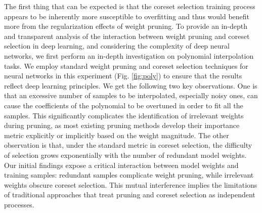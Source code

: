 The first thing that can be expected is that the coreset selection training process appears to be inherently more susceptible to overfitting and thus would benefit more from the regularization effects of weight pruning.
To provide an in-depth and transparent analysis of the interaction between weight pruning and coreset selection in deep learning, and considering the complexity of deep neural networks, we first perform an in-depth investigation on polynomial interpolation tasks. 
We employ standard weight pruning and coreset selection techniques for neural networks in this experiment (Fig. \ref{fig:poly}) to ensure that the results reflect deep learning principles. 
We get the following two key observations. One is that an excessive number of samples to be interpolated, especially noisy ones, can cause the coefficients of the polynomial to be overtuned in order to fit all the samples. This significantly complicates the identification of irrelevant weights during pruning, as most existing pruning methods develop their importance metric explicitly or implicitly based on the weight magnitude. The other observation is that, under the standard metric in coreset selection, the difficulty of selection grows exponentially with the number of redundant model weights. Our initial findings expose a critical interaction between model weights and training samples: redundant samples complicate weight pruning, while irrelevant weights obscure coreset selection. 
This mutual interference implies the limitations of traditional approaches that treat pruning and coreset selection as independent processes.



